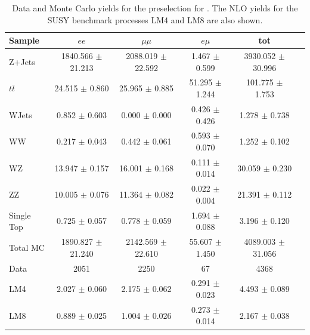 \begin{table}[htb]
\begin{center}
\caption{\label{preselyieldtable} Data and Monte Carlo yields for the preselection for \lumi. 
  The NLO yields for the SUSY benchmark processes LM4 and LM8 are also shown.}
\begin{tabular}{lccccc}
\hline
              Sample   &                $ee$   &            $\mu\mu$   &              $e\mu$   &                 tot  \\
\hline
       Z+Jets & 1840.566 $\pm$ 21.213  &  2088.019 $\pm$ 22.592  &   1.467 $\pm$  0.599  &  3930.052 $\pm$ 30.996 \\ 
   $t\bar{t}$ & 24.515 $\pm$  0.860  &  25.965 $\pm$  0.885  &  51.295 $\pm$  1.244  &  101.775 $\pm$  1.753 \\ 
        WJets &  0.852 $\pm$  0.603  &   0.000 $\pm$  0.000  &   0.426 $\pm$  0.426  &   1.278 $\pm$  0.738 \\ 
           WW &  0.217 $\pm$  0.043  &   0.442 $\pm$  0.061  &   0.593 $\pm$  0.070  &   1.252 $\pm$  0.102 \\ 
           WZ & 13.947 $\pm$  0.157  &  16.001 $\pm$  0.168  &   0.111 $\pm$  0.014  &  30.059 $\pm$  0.230 \\ 
           ZZ & 10.005 $\pm$  0.076  &  11.364 $\pm$  0.082  &   0.022 $\pm$  0.004  &  21.391 $\pm$  0.112 \\ 
   Single Top &  0.725 $\pm$  0.057  &   0.778 $\pm$  0.059  &   1.694 $\pm$  0.088  &   3.196 $\pm$  0.120 \\ 
\hline
     Total MC & 1890.827 $\pm$ 21.240  &  2142.569 $\pm$ 22.610  &  55.607 $\pm$  1.450  &  4089.003 $\pm$ 31.056 \\ 
\hline
         Data &   2051                 &    2250                 &      67               &    4368 \\ 
\hline
          LM4 &  2.027 $\pm$  0.060  &   2.175 $\pm$  0.062  &   0.291 $\pm$  0.023  &   4.493 $\pm$  0.089 \\ 
          LM8 &  0.889 $\pm$  0.025  &   1.004 $\pm$  0.026  &   0.273 $\pm$  0.014  &   2.167 $\pm$  0.038 \\ 

\hline
\end{tabular}
\end{center}
\end{table}




